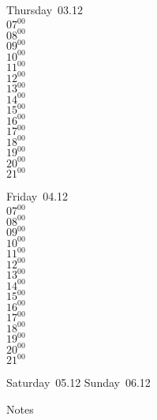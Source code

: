 \documentclass[11pt,a4paper]{book}\usepackage[]{graphicx}\usepackage[]{color}
\begin{document}
\clearpage
\begin{headerbox}
\end{headerbox}
\begin{weekdaybox}
  Thursday~03.12\\
  { 
  \vfill
  $07^{00}$\\
$08^{00}$\\
$09^{00}$\\
$10^{00}$\\
$11^{00}$\\
$12^{00}$\\
$13^{00}$\\
$14^{00}$\\
$15^{00}$\\
$16^{00}$\\
$17^{00}$\\
$18^{00}$\\
$19^{00}$\\
$20^{00}$\\
$21^{00}$\\
  }
\end{weekdaybox} 
\begin{weekdaybox}
  Friday~04.12\\
  { 
  \vfill
  $07^{00}$\\
$08^{00}$\\
$09^{00}$\\
$10^{00}$\\
$11^{00}$\\
$12^{00}$\\
$13^{00}$\\
$14^{00}$\\
$15^{00}$\\
$16^{00}$\\
$17^{00}$\\
$18^{00}$\\
$19^{00}$\\
$20^{00}$\\
$21^{00}$\\
  }
\end{weekdaybox}
\begin{weekendbox}
  Saturday~05.12
  \tcblower
  Sunday~06.12
\end{weekendbox} %
\begin{notebox}
  Notes
\end{notebox}
\clearpage
\end{document}
